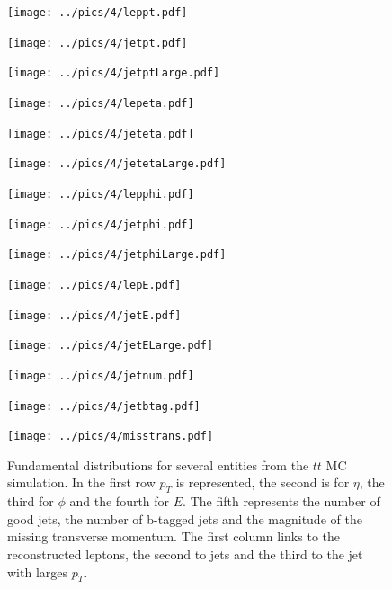 \begin{figure}[H]
\begin{minipage}{0.32\textwidth}
 \texttt{[image: ../pics/4/leppt.pdf]}
\end{minipage}
\begin{minipage}{0.32\textwidth}
 \texttt{[image: ../pics/4/jetpt.pdf]}
\end{minipage}
\begin{minipage}{0.32\textwidth}
 \texttt{[image: ../pics/4/jetptLarge.pdf]}
\end{minipage}
\begin{minipage}{0.32\textwidth}
 \texttt{[image: ../pics/4/lepeta.pdf]}
\end{minipage}
\begin{minipage}{0.32\textwidth}
 \texttt{[image: ../pics/4/jeteta.pdf]}
\end{minipage}
\begin{minipage}{0.32\textwidth}
 \texttt{[image: ../pics/4/jetetaLarge.pdf]}
\end{minipage}
\begin{minipage}{0.32\textwidth}
 \texttt{[image: ../pics/4/lepphi.pdf]}
\end{minipage}
\begin{minipage}{0.32\textwidth}
 \texttt{[image: ../pics/4/jetphi.pdf]}
\end{minipage}
\begin{minipage}{0.32\textwidth}
 \texttt{[image: ../pics/4/jetphiLarge.pdf]}
\end{minipage}
\begin{minipage}{0.32\textwidth}
 \texttt{[image: ../pics/4/lepE.pdf]}
\end{minipage}
\begin{minipage}{0.32\textwidth}
 \texttt{[image: ../pics/4/jetE.pdf]}
\end{minipage}
\begin{minipage}{0.32\textwidth}
 \texttt{[image: ../pics/4/jetELarge.pdf]}
\end{minipage}
\begin{minipage}{0.32\textwidth}
 \texttt{[image: ../pics/4/jetnum.pdf]}
\end{minipage}
\begin{minipage}{0.32\textwidth}
 \texttt{[image: ../pics/4/jetbtag.pdf]}
\end{minipage}
\begin{minipage}{0.32\textwidth}
 \texttt{[image: ../pics/4/misstrans.pdf]}
\end{minipage}
\caption{\small{Fundamental distributions for several entities from the $t\bar t$ MC simulation. In the first row $p_T$ is represented, the second is for $\eta$, the third for $\phi$ and
the fourth for $E$. The fifth represents the number of good jets, the number of b-tagged jets and the magnitude of the missing transverse momentum.
The first column links to the reconstructed leptons, the second to jets and the third to the jet with larges $p_T$.}}
\label{pic:fundamental}
\end{figure}\noindent
